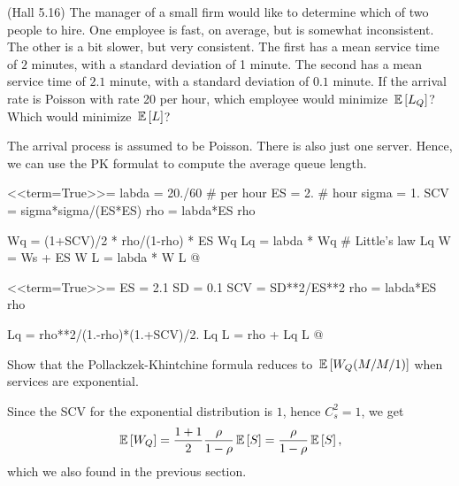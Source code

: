 \begin{question}
  (Hall 5.16) The manager of a small firm would like to determine
  which of two people to hire. One employee is fast, on average, but
  is somewhat inconsistent. The other is a bit slower, but very
  consistent. The first has a mean service time of $2$ minutes, with a
  standard deviation of 1 minute. The second has a mean service time
  of $2.1$ minute, with a standard deviation of $0.1$ minute. If the arrival rate is Poisson with rate 20 per hour, which employee would minimize $\,\mathbb{E}\left[L_Q\right]$? Which would minimize $\,\mathbb{E}\left[L\right]$? 

  \begin{solution}
    
    The arrival process is assumed to be Poisson. There is also
    just one server. Hence, we can use the PK formulat to compute the average queue length.

<<term=True>>=
labda = 20./60 # per hour
ES = 2. # hour
sigma = 1.
SCV = sigma*sigma/(ES*ES)
rho = labda*ES
rho

Wq = (1+SCV)/2 * rho/(1-rho) * ES
Wq
Lq = labda * Wq # Little's law
Lq
W = Ws + ES
W
L = labda * W
L
@ 


<<term=True>>=
ES = 2.1
SD = 0.1
SCV = SD**2/ES**2
rho = labda*ES
rho

Lq = rho**2/(1.-rho)*(1.+SCV)/2.
Lq
L = rho + Lq
L
@ 

  \end{solution}

\end{question}

\begin{question}
 Show that the Pollackzek-Khintchine formula reduces to
    $\,\mathbb{E}\left[W_Q(M/M/1)\right]$ when services are exponential.
    \begin{solution}
      Since the SCV for the exponential distribution is $1$, hence
      $C_s^2=1$, we get 
    \begin{equation*}
\,\mathbb{E}\left[W_Q\right] = \frac{1+1}2\frac{\rho}{1-\rho} \,\mathbb{E}\left[S\right] = \frac{\rho}{1-\rho} \,\mathbb{E}\left[S\right],
    \end{equation*}
which we also found in the previous section.
    \end{solution}
\end{question}


